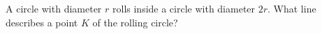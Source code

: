 A circle with diameter $r$ rolls inside a circle with diameter $2r$. What line describes a point $K$ of the rolling circle?
